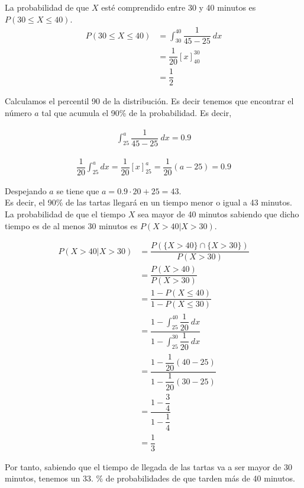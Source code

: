 \documentclass[12pt,a4paper,twoside,openright,titlepage,final]{article}
\begin{document}
La probabilidad de que $X$ esté comprendido entre 30 y 40 minutos es $P(30 \leq X \leq 40)$.\\

\begin{align*}
P(30 \leq X \leq 40) & = \int_{30}^{40} \dfrac{1}{45 -25} \ dx \\
& = \dfrac{1}{20}\left[x\right]_{40}^{30} \\ & = \dfrac{1}{2}
\end{align*}

Calculamos el percentil 90 de la distribución. Es decir tenemos que encontrar el número $a$ tal que acumula el 90\% de la probabilidad. Es decir,

\begin{align*}
\int_{25}^{a} \dfrac{1}{45 - 25} \ dx = 0.9
\end{align*}

\begin{align*}
\dfrac{1}{20}\int_{25}^{a} dx = \dfrac{1}{20} \left[x\right]_{25}^{a} = \dfrac{1}{20}(a - 25) = 0.9
\end{align*}

Despejando $a$ se tiene que $a = 0.9 \cdot 20 + 25 = 43$.\\

Es decir, el 90\% de las tartas llegará en un tiempo menor o igual a 43 minutos.\\

La probabilidad de que el tiempo $X$ sea mayor de 40 minutos sabiendo que dicho tiempo es de al menos 30 minutos es $P(X > 40 | X > 30)$.

\begin{align*}
P(X > 40 | X > 30) & = \dfrac{P(\{X > 40\}\cap \{X > 30\})}{P(X > 30)} \\
& = \dfrac{P(X > 40)}{P(X > 30)} \\ & = \dfrac{1 - P(X \leq 40)}{1 - P(X \leq 30)} \\
& = \dfrac{1 - \int_{25}^{40} \dfrac{1}{20} \ dx}{1 - \int_{25}^{30} \dfrac{1}{20} \ dx} \\
& = \dfrac{1 - \dfrac{1}{20}(40-25)}{1 - \dfrac{1}{20}(30-25)} \\
& = \dfrac{1- \dfrac{3}{4}}{1 - \dfrac{1}{4}} \\
& = \dfrac{1}{3}
\end{align*}

Por tanto, sabiendo que el tiempo de llegada de las tartas va a ser mayor de 30 minutos, tenemos un 33. \% de probabilidades de que tarden más de 40 minutos.
\end{document}

